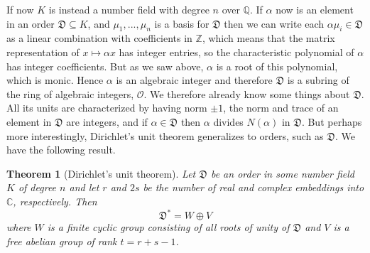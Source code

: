 \documentclass{article}
\newtheorem{theorem}{Theorem}[section]
\newcommand{\mfrak}[1]{\mathfrak{#1}}
\newcommand{\mcal}[1]{\mathcal{#1}}
\newcommand{\mbb}[1]{\mathbb{#1}}
\begin{document}
If now $K$ is instead a number field with degree $n$ over $\mbb{Q}$. If $\alpha$ now is an element in an order $\mfrak D \subseteq K$, and $\mu_1,  ..., \mu_n$ is a basis for $\mfrak D$ then we can write each $\alpha \mu_i \in \mfrak D$ as a linear combination with coefficients in $\mbb Z$, which means that the matrix representation of $x \mapsto \alpha x$ has integer entries, so the characteristic polynomial of $\alpha$ has integer coefficients. But as we saw above, $\alpha$ is a root of this polynomial, which is monic. Hence $\alpha$ is an algebraic integer and therefore $\mfrak D$ is a subring of the ring of algebraic integers, $\mcal O$. We therefore already know some things about $\mfrak D$. All its units are characterized by having norm $\pm 1$, the norm and trace of an element in $\mfrak D$ are integers, and if $\alpha \in \mfrak{D}$ then $\alpha$ divides $N(\alpha)$ in $\mfrak D$. But perhaps more interestingly, Dirichlet's unit theorem generalizes to orders, such as $\mfrak D$. We have the following result.
\begin{theorem}[Dirichlet's unit theorem]
    Let $\mfrak D$ be an order in some number field $K$ of degree $n$ and let $r$ and $2s$ be the number of real and complex embeddings into $\mbb C$, respectively. Then $$\mfrak D^* = W \oplus V$$
    where $W$ is a finite cyclic group consisting of all roots of unity of $\mfrak D$ and $V$ is a free abelian group of rank $t = r + s - 1$.
\end{theorem}
\end{document}
